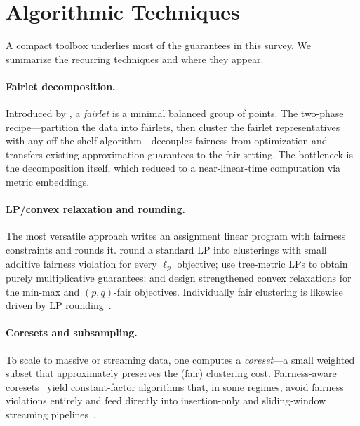\section{Algorithmic Techniques}\label{sec:tech}
\aibanner

A compact toolbox underlies most of the guarantees in this survey. We summarize the recurring techniques and where they appear.

\paragraph{Fairlet decomposition.} Introduced by \citet{DBLP:conf/nips/Chierichetti0LV17}, a \emph{fairlet} is a minimal balanced group of points. The two-phase recipe---partition the data into fairlets, then cluster the fairlet representatives with any off-the-shelf algorithm---decouples fairness from optimization and transfers existing approximation guarantees to the fair setting. The bottleneck is the decomposition itself, which \citet{backurs2019scalable} reduced to a near-linear-time computation via metric embeddings.


\paragraph{LP/convex relaxation and rounding.} The most versatile approach writes an assignment linear program with fairness constraints and rounds it. \citet{bera2019fair} round a standard LP into clusterings with small additive fairness violation for every $\ell_p$ objective; \citet{DBLP:conf/fat/DaiMV22} use tree-metric LPs to obtain purely multiplicative guarantees; and \citet{makarychev2021approximation,DBLP:conf/soda/ChlamtacMV22} design strengthened convex relaxations for the min-max and $(p,q)$-fair objectives. Individually fair clustering is likewise driven by LP rounding~\citep{ChakrabartyN21,VakilianY22}.

\paragraph{Coresets and subsampling.} To scale to massive or streaming data, one computes a \emph{coreset}---a small weighted subset that approximately preserves the (fair) clustering cost. Fairness-aware coresets~\citep{DBLP:conf/waoa/0001SS19,DBLP:conf/nips/HuangJV19,DBLP:conf/icalp/BandyapadhyayFS21} yield constant-factor algorithms that, in some regimes, avoid fairness violations entirely and feed directly into insertion-only and sliding-window streaming pipelines~\citep{cohenfair25}.

